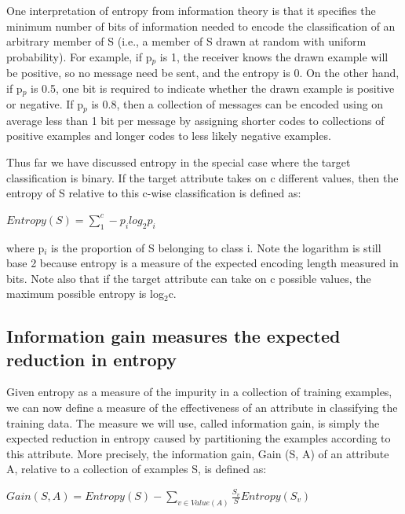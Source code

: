 \documentclass[12pt]{report}
\begin{document}
One interpretation of entropy from information theory is that it specifies the minimum number of bits of information needed to encode the classification of an arbitrary member of S (i.e., a member of S drawn at random with uniform probability). For example, if p$_{p}$ is 1, the receiver knows the drawn example will be positive, so no message need be sent, and the entropy is 0. On the other hand, if p$_{p}$ is 0.5, one bit is required to indicate whether the drawn example is positive or negative. If p$_{p}$ is 0.8, then a collection of messages can be encoded using on average less than 1 bit per message by assigning shorter codes to collections of positive examples and longer codes to less likely negative examples.

Thus far we have discussed entropy in the special case where the target classification is binary. If the target attribute takes on c different values, then the entropy of S relative to this c-wise classification is defined as:

\begin{math}
Entropy(S) = \sum_{1}^{c} -p_{i} log_{2} p_{i}
\end{math}

where p$_{i}$ is the proportion of S belonging to class i. Note the logarithm is still base 2 because entropy is a measure of the expected encoding length measured in bits. Note also that if the target attribute can take on c possible values, the maximum possible entropy is log$_{2}$c. 

\subsection{Information gain measures the expected reduction in entropy}
Given entropy as a measure of the impurity in a collection of training examples, we can now define a measure of the effectiveness of an attribute in classifying the training data. The measure we will use, called information gain, is simply the expected reduction in entropy caused by partitioning the examples according to this attribute. More precisely, the information gain, Gain (S, A) of an attribute A, relative to a collection of examples S, is defined as:

\begin{math}
Gain(S, A) = Entropy(S) - \sum_{v \in Value(A)} \frac{S_{v}}{S} Entropy(S_{v})
\end{math}
\end{document}
